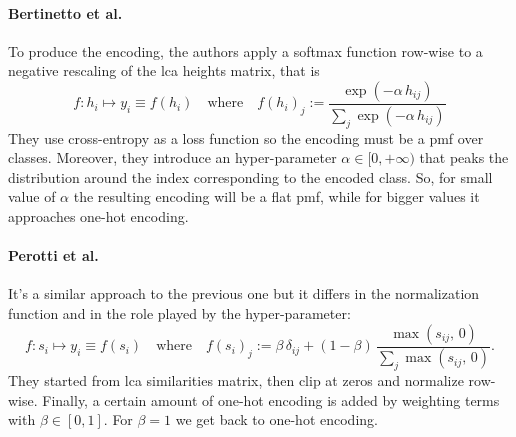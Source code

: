 \paragraph{Bertinetto et al.~\cite{MakingBetterMBertin2019}}\label{par:encoding-mbm}
To produce the encoding, the authors apply a softmax function row-wise to a
negative rescaling of the \acrshort{lca} heights matrix, that is
\begin{equation}
  f : h_i \mapsto y_i \equiv f(h_i)
  \quad \textrm{where} \quad
  f (h_i)_j := \frac{\exp \left({-\alpha \, h_{ij}}\right)}
  {\sum_j \exp\left({-\alpha \, h_{ij}}\right)}
  \label{eq:mbm-hierarchical-encoding}
\end{equation}
They use cross-entropy as a loss function so the encoding must be a
\acrshort{pmf} over classes. Moreover, they introduce an hyper-parameter $\alpha
\in [0, +\infty)$ that peaks the distribution around the index corresponding to
the encoded class. So, for small value of $\alpha$ the resulting encoding will
be a flat \acrshort{pmf}, while for bigger values it approaches one-hot
encoding.

\paragraph{Perotti et al.~\cite{BeyondOneHotPerott2023}}\label{par:encoding-b3p}
It's a similar approach to the previous one but it differs in the normalization
function and in the role played by the hyper-parameter:
\begin{equation}
  f :  s_i \mapsto y_i \equiv f(s_i)
  \quad \textrm{where} \quad
  f (s_i)_j := \beta \, \delta_{ij} +
  \left(1 - \beta \right) \, \frac{\max \left(s_{ij},\,0\right)}
  {\sum_j \max \left(s_{ij},\,0\right)}.
  \label{eq:b3p-hierarchical-encoding}
\end{equation}
They started from \acrshort{lca} similarities matrix, then clip at zeros and
normalize row-wise. Finally, a certain amount of one-hot encoding is added by
weighting terms with $\beta \in [0, 1]$. For $\beta = 1$ we get back to one-hot
encoding.

